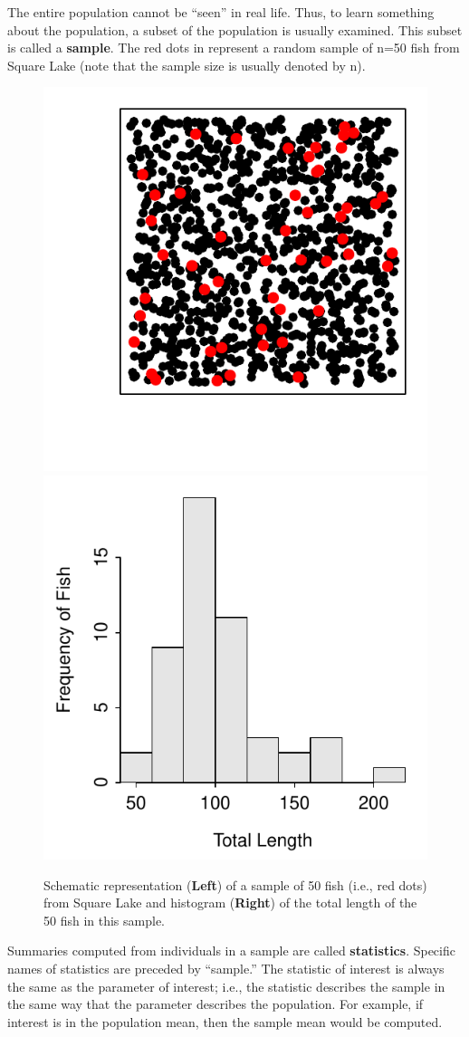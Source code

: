 \documentclass[10pt,openany]{book}\usepackage[]{graphicx}\usepackage[]{color}
\newenvironment{knitrout}{}{} %
\begin{document}
The entire population cannot be ``seen'' in real life. Thus, to learn something about the population, a subset of the population is usually examined. This subset is called a \textbf{sample}. The red dots in  represent a random sample of n=50 fish from Square Lake (note that the sample size is usually denoted by n).

\begin{knitrout}
\color{fgcolor}\begin{figure}[hbtp]

{\centering \includegraphics[width=.4\linewidth]{Figs/SquareLakeSample1-1} 
\includegraphics[width=.4\linewidth]{Figs/SquareLakeSample1-2} 

}

\caption{Schematic representation (\textbf{Left}) of a sample of 50 fish (i.e., red dots) from Square Lake and histogram (\textbf{Right}) of the total length of the 50 fish in this sample.}\label{fig:SquareLakeSample1}
\end{figure}


\end{knitrout}

Summaries computed from individuals in a sample are called \textbf{statistics}.  Specific names of statistics are preceded by ``sample.''  The statistic of interest is always the same as the parameter of interest; i.e., the statistic describes the sample in the same way that the parameter describes the population. For example, if interest is in the population mean, then the sample mean would be computed.
\end{document}
